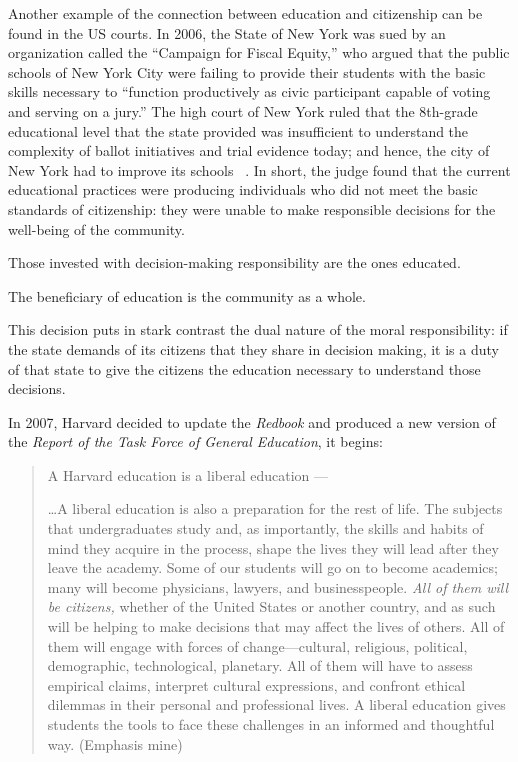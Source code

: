 Another example of the connection between education and citizenship can be found in the US courts. In 2006, the State of New York was sued by an organization called the ``Campaign for Fiscal Equity,'' who argued that the public schools of New York City were failing to provide their students with the basic skills necessary to ``function productively as civic participant capable of voting and serving on a jury.'' The high court of New York ruled that the 8th-grade educational level that the state provided was insufficient to understand the complexity of ballot initiatives and trial evidence today; and hence, the city of New York had to improve its schools ~\citep{Anonymous:TTnUtm2P}. In short, the judge found that the current educational practices were producing individuals who did not meet the basic standards of citizenship: they were unable to make responsible decisions for the well-being of the community.  
\begin{entities}\label{citizenshipentities}
Those invested with decision-making responsibility are the ones educated.
\end{entities} 
\begin{objects}\label{citizenobjects}
The beneficiary of education is the community as a whole.
\end{objects}


This decision puts in stark contrast the dual nature of the moral responsibility: if the state demands of its citizens that they share in decision making, it is a duty of that state to give the citizens the education necessary to understand those decisions. 

In 2007, Harvard decided to update the \emph{Redbook} and produced a new version of the \emph{Report of the Task Force of General Education}, it begins:

\begin{quote}

A Harvard education is a liberal education ---

{\ldots}A liberal education is also a preparation for the rest of life. The subjects that undergraduates study and, as importantly, the skills and habits of mind they acquire in the process, shape the lives they will lead after they leave the academy. Some of our students will go on to become academics; many will become physicians, lawyers, and businesspeople. \emph{All of them will be citizens,} whether of the United States or another country, and as such will be helping to make decisions that may affect the lives of others. All of them will engage with forces of change---cultural, religious, political, demographic, technological, planetary. All of them will have to assess empirical claims, interpret cultural expressions, and confront ethical dilemmas in their personal and professional lives. A liberal education gives students the tools to face these challenges in an informed and thoughtful way. (Emphasis mine)~\citep[p. 1]{Harvard:2007uo}
\end{quote}

